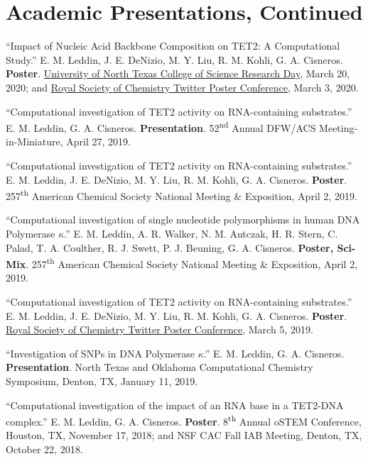 \documentclass[letterpaper,11pt]{article}
\begin{document}
\section{Academic Presentations, Continued}
\begin{etaremune}[start=12]

  \item \textnormal{``Impact of Nucleic Acid Backbone Composition on TET2: A Computational Study.'' E. M. Leddin, J. E. DeNizio, M. Y. Liu, R. M. Kohli, G. A. Cisneros. \textbf{Poster}. \href{https://twitter.com/EmLedd1/status/1239679717575360512?s=20}{University of North Texas College of Science Research Day}, March 20, 2020; and \href{https://twitter.com/EmLedd1/status/1234811448720797696?s=20}{Royal Society of Chemistry Twitter Poster Conference}, March 3, 2020.}
  \item \textnormal{``Computational investigation of TET2 activity on RNA-containing substrates.'' E. M. Leddin, G. A. Cisneros. \textbf{Presentation}. 52\textsuperscript{nd} Annual DFW/ACS Meeting-in-Miniature, April 27, 2019.}
  \item \textnormal{``Computational investigation of TET2 activity on RNA-containing substrates.'' E. M. Leddin, J. E. DeNizio, M. Y. Liu, R. M. Kohli, G. A. Cisneros. \textbf{Poster}. 257\textsuperscript{th} American Chemical Society National Meeting \& Exposition, April 2, 2019.}
  \item \textnormal{``Computational investigation of single nucleotide polymorphisms in human DNA Polymerase $\kappa$.'' E. M. Leddin, A. R. Walker, N. M. Antczak, H. R. Stern, C. Palad, T. A. Coulther, R. J. Swett, P. J. Beuning, G. A. Cisneros. \textbf{Poster, Sci-Mix}. 257\textsuperscript{th} American Chemical Society National Meeting \& Exposition, April 2, 2019.}
  \item \textnormal{``Computational investigation of TET2 activity on RNA-containing substrates.'' E. M. Leddin, J. E. DeNizio, M. Y. Liu, R. M. Kohli, G. A. Cisneros. \textbf{Poster}. \href{https://twitter.com/EmLedd1/status/1103107933951459333?s=20}{Royal Society of Chemistry Twitter Poster Conference}, March 5, 2019.}
  \item \textnormal{``Investigation of SNPs in DNA Polymerase $\kappa$.'' E. M. Leddin, G. A. Cisneros. \textbf{Presentation}. North Texas and Oklahoma Computational Chemistry Symposium, Denton, TX, January 11, 2019.}
  \item \textnormal{``Computational investigation of the impact of an RNA base in a TET2-DNA complex.'' E. M. Leddin, G. A. Cisneros. \textbf{Poster}. 8\textsuperscript{th} Annual oSTEM Conference, Houston, TX, November 17, 2018; and NSF CAC Fall IAB Meeting, Denton, TX, October 22, 2018.}

\end{etaremune}
\end{document}

